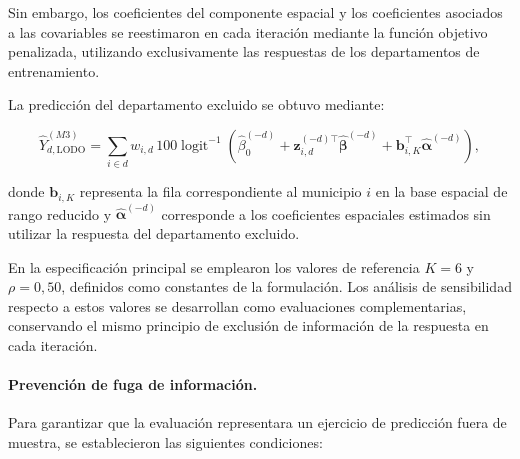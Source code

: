 Sin embargo, los coeficientes del componente espacial y los coeficientes asociados a las covariables se reestimaron en cada iteración mediante la función objetivo penalizada, utilizando exclusivamente las respuestas de los departamentos de entrenamiento.

La predicción del departamento excluido se obtuvo mediante:

\begin{equation}
\widehat{Y}_{d,\mathrm{LODO}}^{(M3)}
=
\sum_{i\in d}
w_{i,d}\,
100\operatorname{logit}^{-1}
\left(
\widehat{\beta}_0^{(-d)}
+
\mathbf{z}_{i,d}^{(-d)\top}
\widehat{\boldsymbol{\beta}}^{(-d)}
+
\mathbf{b}_{i,K}^{\top}
\widehat{\boldsymbol{\alpha}}^{(-d)}
\right),
\label{eq:lodo-m3}
\end{equation}

donde $\mathbf{b}_{i,K}$ representa la fila correspondiente al municipio $i$ en la base espacial de rango reducido y $\widehat{\boldsymbol{\alpha}}^{(-d)}$ corresponde a los coeficientes espaciales estimados sin utilizar la respuesta del departamento excluido.

En la especificación principal se emplearon los valores de referencia $K=6$ y $\rho=0{,}50$, definidos como constantes de la formulación. Los análisis de sensibilidad respecto a estos valores se desarrollan como evaluaciones complementarias, conservando el mismo principio de exclusión de información de la respuesta en cada iteración.

\paragraph{Prevención de fuga de información.}

Para garantizar que la evaluación representara un ejercicio de predicción fuera de muestra, se establecieron las siguientes condiciones:

